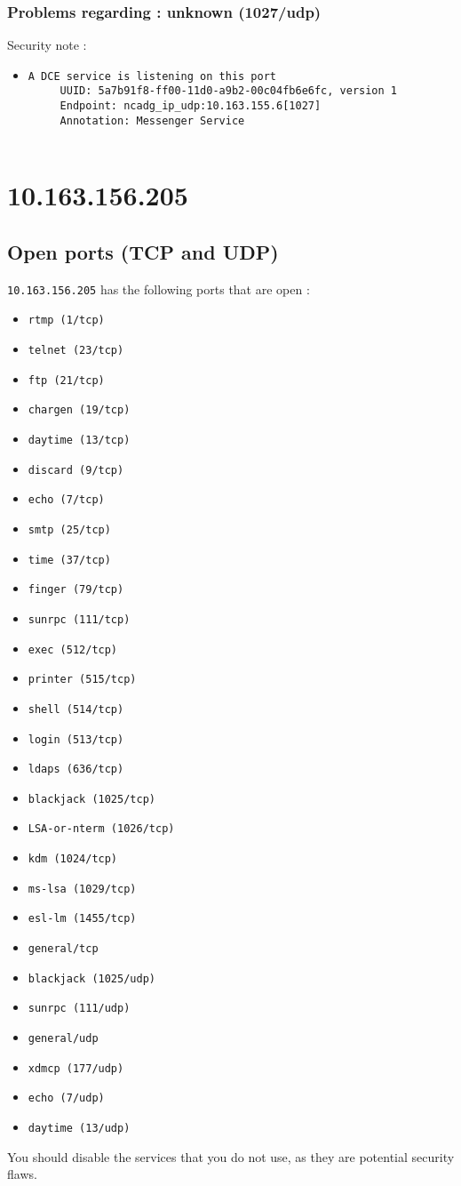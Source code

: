 \documentclass{article}
\begin{document}
\subsubsection{Problems regarding : unknown (1027/udp)}
Security note :\\
\begin{itemize}
\item \begin{verbatim}
A DCE service is listening on this port
     UUID: 5a7b91f8-ff00-11d0-a9b2-00c04fb6e6fc, version 1
     Endpoint: ncadg_ip_udp:10.163.155.6[1027]
     Annotation: Messenger Service


\end{verbatim}\end{itemize}
\newpage
\section{10.163.156.205}
\subsection{Open ports (TCP and UDP)}
\verb+10.163.156.205+ has the following ports that are open : 
\begin{itemize}
\item\verb+rtmp (1/tcp)+
\item\verb+telnet (23/tcp)+
\item\verb+ftp (21/tcp)+
\item\verb+chargen (19/tcp)+
\item\verb+daytime (13/tcp)+
\item\verb+discard (9/tcp)+
\item\verb+echo (7/tcp)+
\item\verb+smtp (25/tcp)+
\item\verb+time (37/tcp)+
\item\verb+finger (79/tcp)+
\item\verb+sunrpc (111/tcp)+
\item\verb+exec (512/tcp)+
\item\verb+printer (515/tcp)+
\item\verb+shell (514/tcp)+
\item\verb+login (513/tcp)+
\item\verb+ldaps (636/tcp)+
\item\verb+blackjack (1025/tcp)+
\item\verb+LSA-or-nterm (1026/tcp)+
\item\verb+kdm (1024/tcp)+
\item\verb+ms-lsa (1029/tcp)+
\item\verb+esl-lm (1455/tcp)+
\item\verb+general/tcp+
\item\verb+blackjack (1025/udp)+
\item\verb+sunrpc (111/udp)+
\item\verb+general/udp+
\item\verb+xdmcp (177/udp)+
\item\verb+echo (7/udp)+
\item\verb+daytime (13/udp)+
\end{itemize}
You should disable the services that you do not use, as they are potential security flaws.
\end{document}
